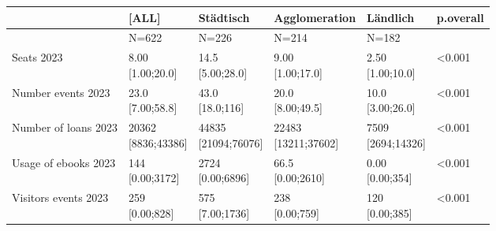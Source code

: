 \documentclass[a4paper,
fontsize=11pt,
oneside,
numbers=noperiodatend,
parskip=half-,
bibliography=totoc,
final
]{scrartcl}
\begin{document}
\begin{landscape}
\begin{table}[]\centering
\begin{tabular}{|l|l|l|l|l|l|}
\hline
                                 & \textbf{{[}ALL{]}}       & \textbf{Städtisch}        & \textbf{Agglomeration}   & \textbf{Ländlich}      & \textbf{p.overall} \\ \hline
                                 & N=622                    & N=226                     & N=214                    & N=182                  &                    \\ \hline
Seats 2023                       & \makecell{ 8.00 \\ {[}1.00;20.0{]}}     & \makecell{ 14.5 \\ {[}5.00;28.0{]}}      & \makecell{ 9.00 \\ {[}1.00;17.0{]}}     & \makecell{ 2.50 \\ {[}1.00;10.0{]}}   & \textless{}0.001   \\ \hline
Number events 2023               & \makecell{ 23.0 \\ {[}7.00;58.8{]}}     & \makecell{ 43.0 \\ {[}18.0;116{]}}       & \makecell{ 20.0 \\ {[}8.00;49.5{]}}     & \makecell{ 10.0 \\ {[}3.00;26.0{]}}   & \textless{}0.001   \\ \hline
Number of loans 2023             & \makecell{ 20362 \\ {[}8836;43386{]}}   & \makecell{ 44835 \\ {[}21094;76076{]}}   & \makecell{ 22483 \\ {[}13211;37602{]}}  & \makecell{ 7509 \\ {[}2694;14326{]}}  & \textless{}0.001   \\ \hline
Usage of ebooks 2023             & \makecell{ 144 \\ {[}0.00;3172{]}}      & \makecell{ 2724 \\ {[}0.00;6896{]}}      & \makecell{ 66.5 \\ {[}0.00;2610{]}}     & \makecell{ 0.00 \\ {[}0.00;354{]}}    & \textless{}0.001   \\ \hline
Visitors events 2023             & \makecell{ 259 \\ {[}0.00;828{]}}       & \makecell{ 575 \\ {[}7.00;1736{]}}       & \makecell{ 238 \\ {[}0.00;759{]}}       & \makecell{ 120 \\ {[}0.00;385{]}}     & \textless{}0.001   \\ \hline

\end{tabular}
\end{table}
\end{landscape}
\end{document}
